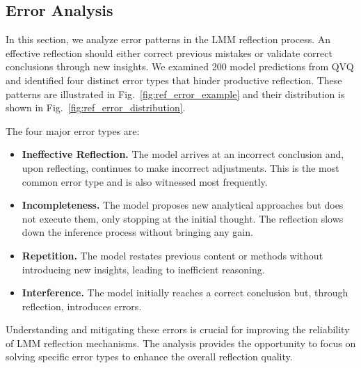 \subsection{Error Analysis}
\label{sec:exp_analysis}
In this section, we analyze error patterns in the LMM reflection process. An effective reflection should either correct previous mistakes or validate correct conclusions through new insights. We examined 200 model predictions from QVQ and identified four distinct error types that hinder productive reflection. These patterns are illustrated in Fig.~\ref{fig:ref_error_example} and their distribution is shown in Fig.~\ref{fig:ref_error_distribution}.

The four major error types are:

\begin{itemize}
    \item \textbf{Ineffective Reflection.} The model arrives at an incorrect conclusion and, upon reflecting, continues to make incorrect adjustments. This is the most common error type and is also witnessed most frequently.
    \item \textbf{Incompleteness.} The model proposes new analytical approaches but does not execute them, only stopping at the initial thought. The reflection slows down the inference process without bringing any gain.
    \item \textbf{Repetition.} The model restates previous content or methods without introducing new insights, leading to inefficient reasoning.
    \item \textbf{Interference.} The model initially reaches a correct conclusion but, through reflection, introduces errors.
\end{itemize}

Understanding and mitigating these errors is crucial for improving the reliability of LMM reflection mechanisms. The analysis provides the opportunity to focus on solving specific error types to enhance the overall reflection quality.

